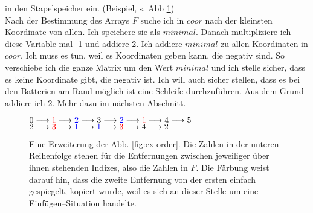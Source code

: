 \documentclass[a4paper,10pt,ngerman]{scrartcl}
\begin{document}
in den Stapelspeicher ein. (Beispiel, s. Abb \ref{fig:ex-dist})\\
Nach der Bestimmung des Arrays $F$ suche ich in $coor$ nach der kleinsten Koordinate von allen. 
Ich speichere sie als $minimal$. Danach multipliziere ich diese Variable mal -1 und addiere 2.
Ich addiere $minimal$ zu allen Koordinaten in $coor$. Ich muss es tun, weil es Koordinaten geben kann,
die negativ sind. So verschiebe ich die ganze Matrix um den Wert $minimal$ und ich stelle sicher,
dass es keine Koordinate gibt, die negativ ist. Ich will auch sicher stellen, dass es bei den Batterien am Rand
möglich ist eine Schleife durchzuführen. Aus dem Grund addiere ich 2. Mehr dazu im nächsten Abschnitt.

\begin{figure}[h]
\centering
$0 \longrightarrow {\color{red}1} \longrightarrow {\color{blue}2} \longrightarrow 3 \longrightarrow {\color{blue}2}
\longrightarrow {\color{red}1} \longrightarrow 4 \longrightarrow 5$\\
$2 \longrightarrow {\color{red}3} \longrightarrow {\color{blue}1} \longrightarrow {\color{blue}1} \longrightarrow
 {\color{red}3} \longrightarrow 4 \longrightarrow 2$
\caption{Eine Erweiterung der Abb. \ref{fig:ex-order}. Die Zahlen in der unteren Reihenfolge stehen für
die Entfernungen zwischen jeweiliger über ihnen stehenden Indizes, also die Zahlen in $F$. Die Färbung weist darauf hin, dass
die zweite Entfernung von der ersten einfach gespiegelt, kopiert wurde, weil es sich an dieser Stelle um
eine Einfügen--Situation handelte.}
\label{fig:ex-dist}
\end{figure}
\end{document}
